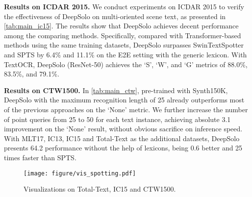 \documentclass[10pt,twocolumn,letterpaper]{article}
\begin{document}
\begin{table}[!t]
\noindent \textbf{Results on ICDAR 2015.} We conduct experiments on ICDAR 2015 to verify the effectiveness of DeepSolo on multi-oriented scene text, as presented in \cref{tab:main_ic15}. The results show that DeepSolo achieves decent performance among the comparing methods. Specifically, compared with Transformer-based methods using the same training datasets, DeepSolo surpasses SwinTextSpotter and SPTS by 6.4\% and 11.1\% on the E2E setting with the generic lexicon. With TextOCR, DeepSolo (ResNet-50) achieves the ‘S’, ‘W’, and ‘G’ metrics of 88.0\%, 83.5\%, and 79.1\%.

\noindent \textbf{Results on CTW1500.} In \cref{tab:main_ctw}, pre-trained with Synth150K, DeepSolo with the maximum recognition length of 25 already outperforms most of the previous approaches on the ‘None’ metric. We further increase the number of point queries from 25 to 50 for each text instance, achieving absolute 3.1 improvement on the ‘None’ result, without obvious sacrifice on inference speed. With MLT17, IC13, IC15 and Total-Text as the additional datasets, DeepSolo presents 64.2 performance without the help of lexicons, being 0.6 better and 25 times faster than SPTS.

\begin{figure}[!t]
    \centering
    \texttt{[image: figure/vis\_spotting.pdf]}
    \caption{Visualizations on Total-Text, IC15 and CTW1500.}
    \label{fig:qualitative_result}
\end{figure}


\end{table}
\end{document}
